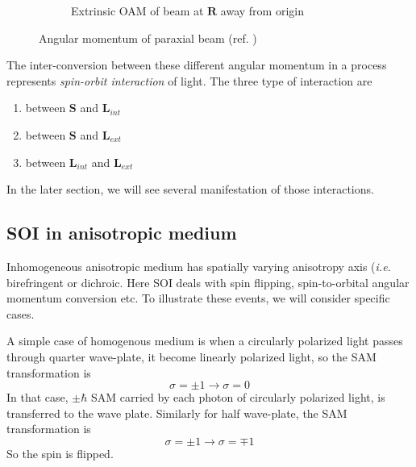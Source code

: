 \documentclass[11pt,a4paper]{article}
\numberwithin{equation}{section}
\begin{document}
\begin{figure}[H]
\begin{subfigure}[H]{0.31\textwidth}
		\caption{Extrinsic OAM of beam at $\boldsymbol{R}$ away from origin}
		\label{fig:eoam}
	\end{subfigure}
	\caption{Angular momentum of paraxial beam (ref. \cite{bliokh 15})}
	\label{fig:am}
\end{figure}

The inter-conversion between these different angular momentum in a process represents \textit{spin-orbit interaction} of light. \cite{bliokh 15} The three type of interaction  are
\begin{enumerate}
	\item between $\boldsymbol{S}$ and $\boldsymbol{L}_{int}$
	\item between $\boldsymbol{S}$ and $\boldsymbol{L}_{ext}$
	\item between $\boldsymbol{L}_{int}$ and $\boldsymbol{L}_{ext}$
\end{enumerate}
In the later section, we will see several manifestation of those interactions.


\subsection{SOI in anisotropic medium}
Inhomogeneous anisotropic medium has spatially varying anisotropy axis (\textit{i.e.} birefringent or dichroic. Here SOI deals with spin flipping, spin-to-orbital angular momentum conversion etc. To illustrate these events, we will consider specific cases.

A simple case of homogenous medium is when a circularly polarized light passes through quarter wave-plate, it become linearly polarized light, so the SAM transformation is $$\sigma=\pm1 \longrightarrow \sigma= 0$$ 
In that case, $\pm\hbar$ SAM carried by each photon of circularly polarized light, is transferred to the wave plate. Similarly for half wave-plate, the SAM transformation is 
$$\sigma=\pm 1 \longrightarrow \sigma=\mp1$$ So the spin is flipped.
\end{document}
